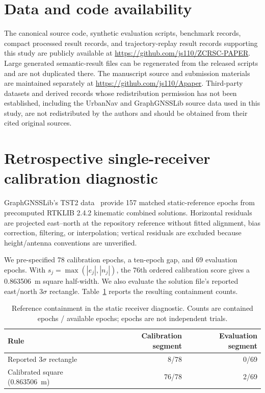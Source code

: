 \documentclass[preprint,review,12pt]{elsarticle}
\begin{document}
\section*{Data and code availability}
The canonical source code, synthetic evaluation scripts, benchmark records, compact processed result records, and trajectory-replay result records supporting this study are publicly available at \url{https://github.com/js110/ZCRSC-PAPER}. Large generated semantic-result files can be regenerated from the released scripts and are not duplicated there. The manuscript source and submission materials are maintained separately at \url{https://github.com/js110/Apaper}. Third-party datasets and derived records whose redistribution permission has not been established, including the UrbanNav and GraphGNSSLib source data used in this study, are not redistributed by the authors and should be obtained from their cited original sources.

\appendix
\setcounter{table}{0}
\setcounter{figure}{0}
\renewcommand{\theHtable}{appendix.\arabic{table}}
\renewcommand{\theHfigure}{appendix.\arabic{figure}}
\section{Retrospective single-receiver calibration diagnostic}\label{app:receiver}
GraphGNSSLib's TST2 data~\cite{GraphGNSSData} provide 157 matched static-reference epochs from precomputed RTKLIB 2.4.2 kinematic combined solutions. Horizontal residuals are projected east--north at the repository reference without fitted alignment, bias correction, filtering, or interpolation; vertical residuals are excluded because height/antenna conventions are unverified.

We pre-specified 78 calibration epochs, a ten-epoch gap, and 69 evaluation epochs. With $s_j=\max(|e_j|,|n_j|)$, the 76th ordered calibration score gives a 0.863506~m square half-width. We also evaluate the solution file's reported east/north $3\sigma$ rectangle. Table~\ref{tab:receiver} reports the resulting containment counts.

\begin{table}[htbp]
\centering\small
\caption{Reference containment in the static receiver diagnostic. Counts are contained epochs / available epochs; epochs are not independent trials.}\label{tab:receiver}
\begin{tabular}{lrr}
\toprule Rule&Calibration segment&Evaluation segment\\\midrule
Reported $3\sigma$ rectangle&8/78&0/69\\
Calibrated square (0.863506~m)&76/78&2/69\\\bottomrule
\end{tabular}
\end{table}
\end{document}
